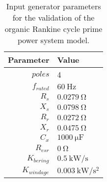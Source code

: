 \begin{table}%
	\centering
	\caption{Input generator parameters for the validation of the organic Rankine cycle prime power system model.}
	\label{tab:verification_SCIG_params}
	\begin{tabular}{rl}
		\toprule
		    Parameter & Value                                       \\ \midrule
		      $poles$ & 4                                           \\
		  $f_{rated}$ & $\SI{60}{\hertz}$                           \\
		        $R_s$ & $\SI{0.0279}{\ohm}$                         \\
		        $X_s$ & $\SI{0.0798}{\ohm}$                         \\
		        $R_r$ & $\SI{0.0272}{\ohm}$                         \\
		        $X_r$ & $\SI{0.0475}{\ohm}$                         \\
		        $C_x$ & $\SI{1000}{\micro\farad}$                   \\
		    $R_{esr}$ & $\SI{0}{\ohm}$                              \\
		 $K_{bering}$ & $\SI{0.5}{\kilo\watt\per\second}$           \\
		$K_{windage}$ & $\SI{0.003}{\kilo\watt\per\second\squared}$ \\ \bottomrule
	\end{tabular}
\end{table}
